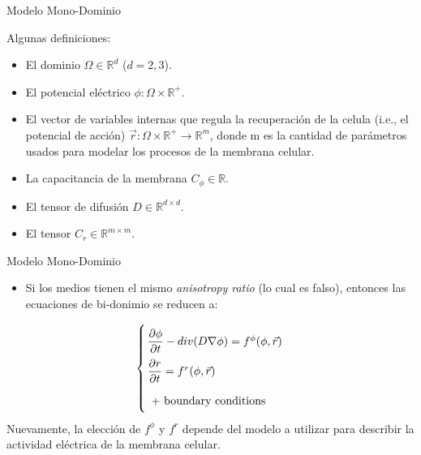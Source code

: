 \documentclass[11pt,spanish]{beamer}
\begin{document}
\begin{frame}{Modelo Mono-Dominio}

Algunas definiciones:
\begin{itemize}
\item El dominio $\Omega \in \mathbb{R}^d$ ($d = 2,3$).
\item El potencial eléctrico $\phi: \Omega \times \mathbb{R^+}$.
\item El vector de variables internas que regula la recuperación de la celula (i.e., el potencial de acción) $\vec{r}: \Omega \times \mathbb{R}^+ \rightarrow \mathbb{R}^m$, donde m es la cantidad de parámetros usados para modelar los procesos de la membrana celular.
\item La capacitancia de la membrana $C_{\phi} \in \mathbb{R}$.
\item El tensor de difusión $D \in \mathbb{R}^{d \times d}$.
\item El tensor $C_r \in \mathbb{R}^{m \times m}$.
\end{itemize}
\end{frame}

\begin{frame}{Modelo Mono-Dominio}
\begin{itemize}
\item Si los medios tienen el mismo \textsl{anisotropy ratio} (lo cual es falso), entonces las ecuaciones de bi-donimio se reducen a:
\end{itemize}
\begin{equation}
\arraycolsep=1.4pt\def\arraystretch{2.2}
\left\lbrace
\begin{array}{lr}
\dfrac{\partial \phi}{ \partial t} - div(D \nabla \phi) = f^{\phi}(\phi, \vec{r}) \\
\dfrac{\partial r}{\partial t} =  f^{r}(\phi, \vec{r})\\
\text{ + boundary conditions }
\end{array}
\right.  \label{eq:MDE}
\end{equation}
Nuevamente, la elección de $f^{\phi}$ y $f^{r}$ depende del modelo a utilizar para describir la actividad eléctrica de la membrana celular.
\end{frame}
\end{document}
